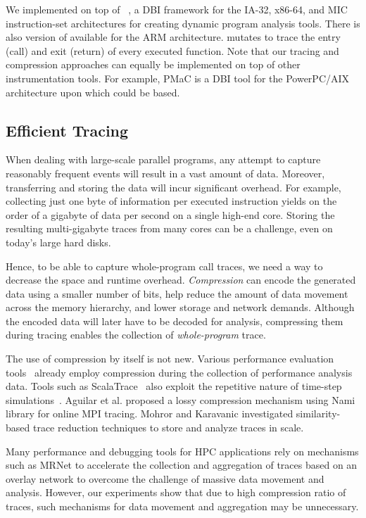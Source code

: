  
%


We implemented \parlot on top of \pin~\cite{pin}, a DBI framework for the IA-32, x86-64, and MIC instruction-set architectures for creating dynamic program analysis tools. There is also version of \pin available for the ARM architecture\cite{pinarm}. \parlot mutates \pin to trace the entry (call) and exit (return) of every executed function. Note that our tracing and compression approaches can equally be implemented on top of other instrumentation tools. For example, PMaC \cite{pmac} is a DBI tool for the PowerPC/AIX architecture upon which \parlot could be based.


\subsection{Efficient Tracing}
When dealing with large-scale parallel programs, any attempt to capture reasonably frequent events will result in a vast amount of data. Moreover, transferring and storing the data will incur significant overhead. For example, collecting just one byte of information per executed instruction yields on the order of a gigabyte of data per second on a single high-end core. Storing the resulting multi-gigabyte traces from many cores can be a challenge, even on today's large hard disks.

Hence, to be able to capture whole-program call traces, we need a way to decrease the space and runtime overhead. \textit{Compression} can encode the generated data using a smaller number of bits, help
reduce the amount of data movement across the memory hierarchy, and
lower storage and network demands.
%
Although the encoded data will later have to be decoded for analysis, compressing them during tracing enables the collection of {\em whole-program} trace.

The use of compression by itself is not new.
Various performance evaluation tools~\cite{tau,scorep,eventflowgraph} 
already employ compression during the collection
of performance analysis data.
%
Tools such as ScalaTrace~\cite{scalatrace}
also exploit
the repetitive nature of time-step simulations~\cite{freitag}. Aguilar et al\cite{aguilar}. proposed a lossy compression mechanism using Nami library\cite{gamblinNami}  for online MPI tracing. Mohror and Karavanic\cite{mohror} investigated similarity-based trace reduction techniques to store and analyze traces in scale. 


Many performance and debugging tools for HPC applications \cite{stat,taumrnet} rely on mechanisms such as MRNet\cite{mrnet} to accelerate the collection and aggregation of traces based on an overlay network to overcome the challenge of massive data movement and analysis. However, our experiments show that due to high compression ratio of \parlot traces, such mechanisms for data movement and aggregation may be unnecessary.


